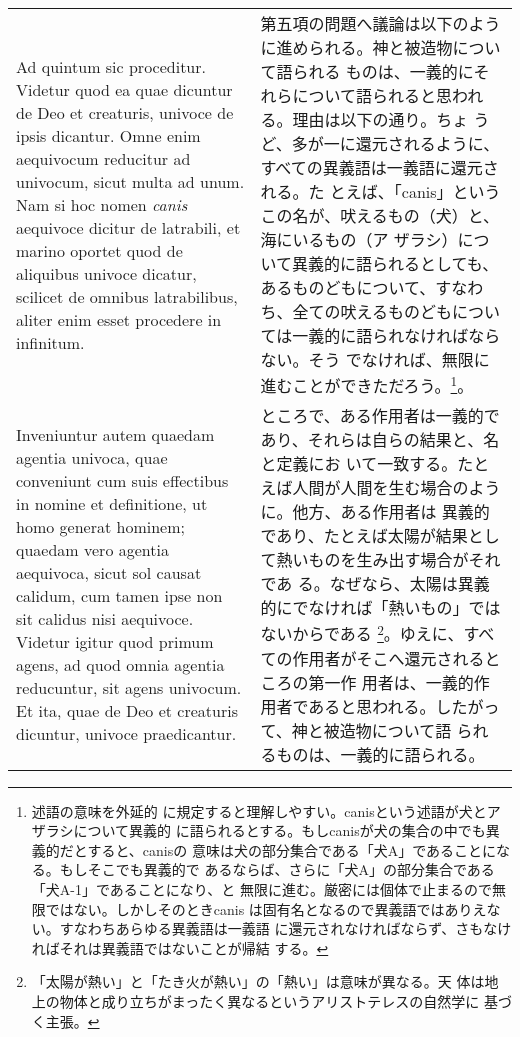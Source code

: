 \documentclass[10pt]{jsarticle} %
\begin{document}
\begin{longtable}{p{21em}p{21em}}


{\sc Ad quintum sic proceditur}. Videtur quod ea quae dicuntur de Deo et
 creaturis, univoce de ipsis dicantur. Omne enim aequivocum reducitur ad
 univocum, sicut multa ad unum. Nam si hoc nomen {\it canis} aequivoce dicitur
 de latrabili,
et marino
 oportet quod de aliquibus univoce dicatur,
 scilicet de omnibus latrabilibus, aliter enim esset procedere in
 infinitum. 

&

第五項の問題へ議論は以下のように進められる。神と被造物について語られる
ものは、一義的にそれらについて語られると思われる。理由は以下の通り。ちょ
うど、多が一に還元されるように、すべての異義語は一義語に還元される。た
とえば、「canis」というこの名が、吠えるもの（犬）と、海にいるもの（ア
ザラシ）について異義的に語られるとしても、あるものどもについて、すなわ
ち、全ての吠えるものどもについては一義的に語られなければならない。そう
でなければ、無限に進むことができただろう。\footnote{述語の意味を外延的
に規定すると理解しやすい。canisという述語が犬とアザラシについて異義的
に語られるとする。もしcanisが犬の集合の中でも異義的だとすると、canisの
意味は犬の部分集合である「犬A」であることになる。もしそこでも異義的で
あるならば、さらに「犬A」の部分集合である「犬A-1」であることになり、と
無限に進む。厳密には個体で止まるので無限ではない。しかしそのときcanis
は固有名となるので異義語ではありえない。すなわちあらゆる異義語は一義語
 に還元されなければならず、さもなければそれは異義語ではないことが帰結
 する。}。

\\

Inveniuntur autem quaedam agentia univoca, quae conveniunt cum suis
effectibus in nomine et definitione, ut homo generat hominem; quaedam
vero agentia aequivoca, sicut sol causat calidum, cum tamen ipse non
sit calidus nisi aequivoce. Videtur igitur quod primum agens, ad quod
omnia agentia reducuntur, sit agens univocum. Et ita, quae de Deo et
creaturis dicuntur, univoce praedicantur.


&

ところで、ある作用者は一義的であり、それらは自らの結果と、名と定義にお
いて一致する。たとえば人間が人間を生む場合のように。他方、ある作用者は
異義的であり、たとえば太陽が結果として熱いものを生み出す場合がそれであ
る。なぜなら、太陽は異義的にでなければ「熱いもの」ではないからである
\footnote{「太陽が熱い」と「たき火が熱い」の「熱い」は意味が異なる。天
体は地上の物体と成り立ちがまったく異なるというアリストテレスの自然学に
基づく主張。}。ゆえに、すべての作用者がそこへ還元されるところの第一作
用者は、一義的作用者であると思われる。したがって、神と被造物について語
られるものは、一義的に語られる。


\end{longtable}
\end{document}
